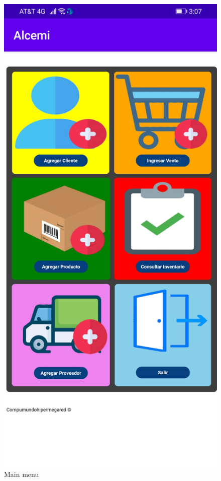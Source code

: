 \documentclass{article}
\begin{document}
\pagebreak

\begin{figure}[h]
\begin{minipage}[t]{0.5\linewidth}
\caption {Main menu}
\centering
\includegraphics[scale=0.16]{fig12}

\end{minipage}
\end{figure}
\end{document}

